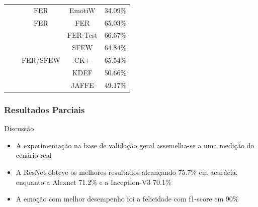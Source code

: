 \documentclass{beamer}
\begin{document}
\begin{frame}
\begin{table}[]
\begin{tabular}{|c|c|c|c|c|}
 &  & FER & EmotiW & 34.09\% \\ \cline{2-5} 
 & \cite{art5} & FER & FER & 65.03\% \\ \cline{2-5} 
 & \multirow{5}{*}{\cite{art6}} & \multirow{5}{*}{FER/SFEW} & FER-Test & 66.67\% \\ \cline{4-5} 
 &  &  & SFEW & 64.84\% \\ \cline{4-5} 
 &  &  & CK+ & 65.54\% \\ \cline{4-5} 
 &  &  & KDEF & 50.66\% \\ \cline{4-5} 
 &  &  & JAFFE & 49.17\% \\ \hline
\end{tabular}
\end{table}
\end{frame}



\begin{frame}
\frametitle{Resultados Parciais}
 \begin{block}{Discussão}
\begin{itemize}
\item A experimentação na base de validação geral assemelha-se a uma medição do cenário real
\item A ResNet obteve os melhores resultados alcançando 75.7\% em acurácia, enquanto a Alexnet 71.2\% e a Inception-V3 70.1\%
\pause
\item A emoção com melhor desempenho foi a felicidade com f1-score em 90\%
\end{itemize}
\end{block}
\end{frame}
\end{document}
